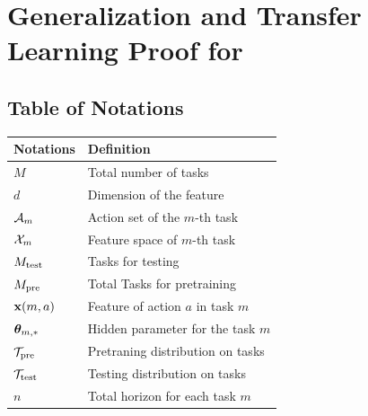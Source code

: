 % 


\section{Generalization and Transfer Learning Proof for \pred}
\label{sec:generalization-app}



\subsection{Table of Notations}
\label{table-notations}

\begin{table}[!tbh]
    \centering
    \begin{tabular}{|p{10em}|p{28em}|}
        \hline\textbf{Notations} & \textbf{Definition} \\\hline
        $M$ & Total number of tasks \\\hline
        $d$ & Dimension of the feature \\\hline
        $\mathcal{A}_m$  & Action set of the $m$-th task \\\hline
        $\mathcal{X}_m$  &Feature space of $m$-th task \\\hline
        $M_{\text{test}}$  & Tasks for testing\\\hline
        $M_{\text{pre}}$  & Total Tasks for pretraining\\\hline
        $\mathbf{x}(m, a)$  & Feature of action $a$ in task $m$\\\hline
        $\boldsymbol{\theta}_{m,*}$  & Hidden parameter for the task $m$\\\hline
        $\mathcal{T}_{\text{pre}}$  & Pretraning distribution on tasks\\\hline
        $\mathcal{T}_{\text{test}}$  & Testing distribution on tasks\\\hline
        $n$  & Total horizon for each task $m$\\\hline

\end{tabular}
\end{table}
